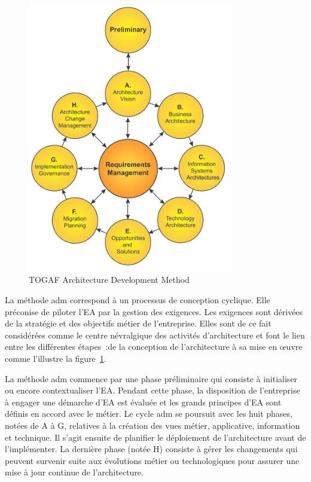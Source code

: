 \begin{figure}[!htbp]
    \begin{center}
    \includegraphics[width=0.8\textwidth]{figures/images/Chapitre1/TOGAF9_Wheel.png}
    \end{center}
    \caption{TOGAF Architecture Development Method \protect\cite{togaf2009}}
    \label{fig:TOGAF}
\end{figure}

La méthode \gls{adm} correspond à un processus de conception cyclique. Elle préconise
de piloter l'EA par la gestion des exigences. Les exigences sont dérivées de la
stratégie et des objectifs métier de l'entreprise. Elles sont de ce fait
considérées comme le centre névralgique des activités d'architecture et font le
lien entre les différentes étapes~:de la conception de l'architecture à sa mise
en œuvre comme l'illustre la figure~\ref{fig:TOGAF}. 

La méthode \gls{adm} commence par une phase préliminaire qui consiste à initialiser
ou encore contextualiser l'EA. Pendant cette phase, la disposition de
l'entreprise à engager une démarche d'EA est évaluée et les grands principes
d'EA sont définis en accord avec le métier. Le cycle \gls{adm} se poursuit avec les
huit phases, notées de A à G, relatives à la création des vues métier,
applicative, information et technique. Il s'agit ensuite de planifier le
déploiement de l'architecture avant de l'implémenter. La dernière phase (notée H)
consiste à gérer les changements qui peuvent survenir suite aux évolutions
métier ou technologiques pour assurer une mise à jour continue de
l'architecture. 

